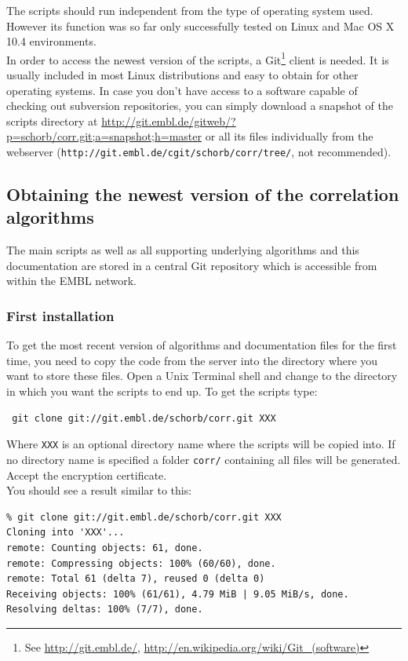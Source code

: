 \documentclass[10pt,a4paper,onepage,DIV12]{scrartcl}
\begin{document}
The scripts should run independent from the type of operating system used. However its function was so far only successfully tested on Linux and Mac OS X 10.4  environments. 
\\

In order to access the newest version of the scripts, a Git\footnote{See \url{http://git.embl.de/},\; \url{http://en.wikipedia.org/wiki/Git_(software)}} client is needed. It is usually included in most Linux distributions and easy to obtain for other operating systems. In case you don't have access to a software capable of checking out subversion repositories, you can simply download a snapshot of the scripts directory at \url{http://git.embl.de/gitweb/?p=schorb/corr.git;a=snapshot;h=master} or all its files individually from the webserver (\texttt{http://git.embl.de/cgit/schorb/corr/tree/}, not recommended).


\subsection{Obtaining the newest version of the correlation algorithms}
The main scripts as well as all supporting underlying algorithms and this documentation are stored in a central Git repository which is accessible from within the EMBL network.
\subsubsection*{First installation}
To get the most recent version of algorithms and documentation files for the first time, you need to copy the code from the server into the directory where you want to store these files. 
Open a Unix Terminal shell and change to the directory in which you want the scripts to end up.
To get the scripts type:
\begin{verbatim}
 git clone git://git.embl.de/schorb/corr.git XXX
\end{verbatim}
Where \texttt{XXX} is an optional directory name where the scripts will be copied into. If no directory name is specified a folder \texttt{corr/} containing all files will be generated. Accept the encryption certificate.\\

You should see a result similar to this:
\begin{verbatim}
% git clone git://git.embl.de/schorb/corr.git XXX
Cloning into 'XXX'...
remote: Counting objects: 61, done.
remote: Compressing objects: 100% (60/60), done.
remote: Total 61 (delta 7), reused 0 (delta 0)
Receiving objects: 100% (61/61), 4.79 MiB | 9.05 MiB/s, done.
Resolving deltas: 100% (7/7), done.
\end{verbatim}
\end{document}
